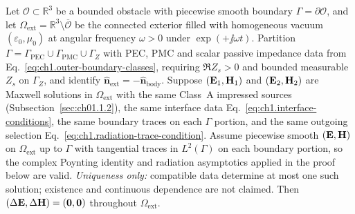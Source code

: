 \begin{theorem}
\label{thm:ch1.exterior-uniqueness}
Let $\mathcal{O}\subset\mathbb{R}^3$ be a bounded obstacle with piecewise smooth boundary $\Gamma=\partial\mathcal{O}$, and let $\Omega_{\mathrm{ext}}=\mathbb{R}^3\setminus\overline{\mathcal{O}}$ be the connected exterior filled with homogeneous vacuum $(\varepsilon_0,\mu_0)$ at angular frequency $\omega>0$ under $\exp(+\jj\omega t)$. Partition $\Gamma=\Gamma_{\mathrm{PEC}}\cup\Gamma_{\mathrm{PMC}}\cup\Gamma_Z$ with PEC, PMC and scalar passive impedance data from Eq.~\eqref{eq:ch1.outer-boundary-classes}, requiring $\Re Z_s>0$ and bounded measurable $Z_s$ on $\Gamma_Z$, and identify $\hat{\mathbf{n}}_{\mathrm{ext}}=-\hat{\mathbf{n}}_{\mathrm{body}}$. Suppose $(\mathbf{E}_1,\mathbf{H}_1)$ and $(\mathbf{E}_2,\mathbf{H}_2)$ are Maxwell solutions in $\Omega_{\mathrm{ext}}$ with the same Class~A impressed sources (Subsection~\ref{sec:ch01.1.2}), the same interface data Eq.~\eqref{eq:ch1.interface-conditions}, the same boundary traces on each $\Gamma$ portion, and the same outgoing selection Eq.~\eqref{eq:ch1.radiation-trace-condition}. Assume piecewise smooth $(\mathbf{E},\mathbf{H})$ on $\Omega_{\mathrm{ext}}$ up to $\Gamma$ with tangential traces in $L^2(\Gamma)$ on each boundary portion, so the complex Poynting identity and radiation asymptotics applied in the proof below are valid. \emph{Uniqueness only:} compatible data determine at most one such solution; existence and continuous dependence are not claimed. Then $(\Delta\mathbf{E},\Delta\mathbf{H})=(\mathbf{0},\mathbf{0})$ throughout $\Omega_{\mathrm{ext}}$.
\end{theorem}

